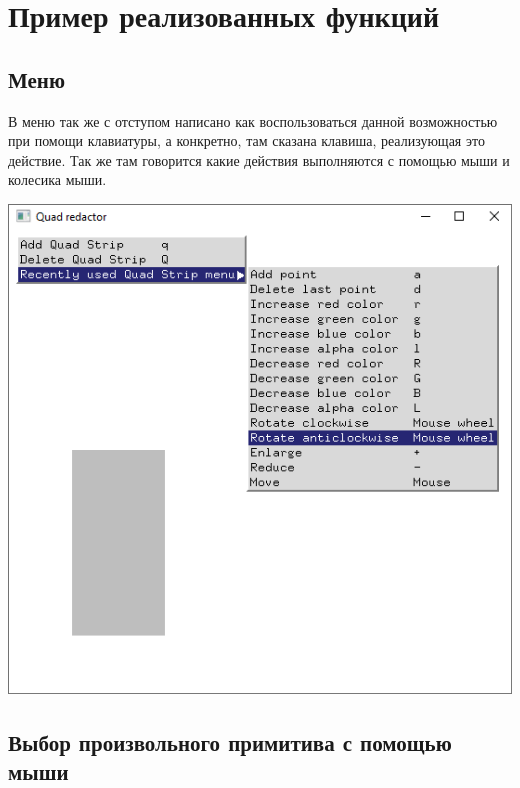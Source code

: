 \section{Пример реализованных функций}

\subsection{Меню}

В меню так же с отступом написано как воспользоваться данной возможностью при помощи клавиатуры, а конкретно, там сказана клавиша, реализующая это действие. Так же там говорится какие действия выполняются с помощью мыши и колесика мыши.

\begin{center}
\includegraphics[scale=0.75]{1.png}
\end{center}

\subsection{Выбор произвольного примитива с помощью мыши}

